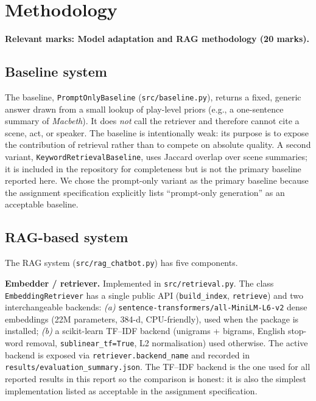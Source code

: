 \documentclass[10pt,twocolumn,a4paper]{article}
\begin{document}
\section{Methodology}
\label{sec:methodology}

\textbf{Relevant marks: Model adaptation and RAG methodology (20 marks).}

\subsection{Baseline system}

The baseline, \verb|PromptOnlyBaseline| (\verb|src/baseline.py|),
returns a fixed, generic answer drawn from a small lookup of
play-level priors (e.g., a one-sentence summary of \emph{Macbeth}).
It does \emph{not} call the retriever and therefore cannot cite a
scene, act, or speaker. The baseline is intentionally weak: its
purpose is to expose the contribution of retrieval rather than to
compete on absolute quality. A second variant,
\verb|KeywordRetrievalBaseline|, uses Jaccard overlap over scene
summaries; it is included in the repository for completeness but is
not the primary baseline reported here. We chose the prompt-only
variant as the primary baseline because the assignment specification
explicitly lists ``prompt-only generation'' as an acceptable baseline.

\subsection{RAG-based system}

The RAG system (\verb|src/rag_chatbot.py|) has five components.

\textbf{Embedder / retriever.} Implemented in
\verb|src/retrieval.py|. The class \verb|EmbeddingRetriever| has a
single public API (\verb|build_index|, \verb|retrieve|) and two
interchangeable backends:
\textit{(a)} \verb|sentence-transformers/all-MiniLM-L6-v2| dense
embeddings (22M parameters, 384-d, CPU-friendly), used when the
package is installed;
\textit{(b)} a scikit-learn TF--IDF backend (unigrams + bigrams,
English stop-word removal, \verb|sublinear_tf=True|, L2 normalisation)
used otherwise. The active backend is exposed via
\verb|retriever.backend_name| and recorded in
\verb|results/evaluation_summary.json|. The TF--IDF backend is the one
used for all reported results in this report so the comparison is
honest: it is also the simplest implementation listed as acceptable
in the assignment specification.
\end{document}
